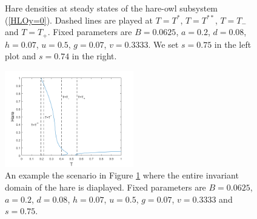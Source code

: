 \documentclass[12pt]{UOthesis}
\theoremstyle{remarkstyle}
\begin{document}
\begin{figure}[h!]
	\centering
	\caption[Steady states in the hare--owl system]{Hare densities at steady states of the hare-owl subsystem (\ref{HLOy=0}). Dashed lines are played at $T=T^*$, $T=T^{**}$,  $T=T_-$ and $T=T_+$. Fixed parameters are $B=0.0625$, $a=0.2$, $d=0.08$, $h=0.07$, $u=0.5$, $g=0.07$, $v=0.3333$. We set $s=0.75$ in the left plot and $s=0.74$ in the right.\label{HOSaddleCrossing}}
\end{figure}

\begin{figure}[h!]
	\centering
	\includegraphics[width=0.5\textwidth]{HOSaddleCrossing3.png}
	\caption[Steady states in the hare--owl system (full invariant domain)]{An example the scenario in Figure \ref{HOSaddleCrossing} where the entire invariant domain of the hare is diaplayed. Fixed parameters are $B=0.0625$, $a=0.2$, $d=0.08$, $h=0.07$, $u=0.5$, $g=0.07$, $v=0.3333$ and $s=0.75$.\label{HOSaddleCrossingFull}}
\end{figure}
\end{document}
